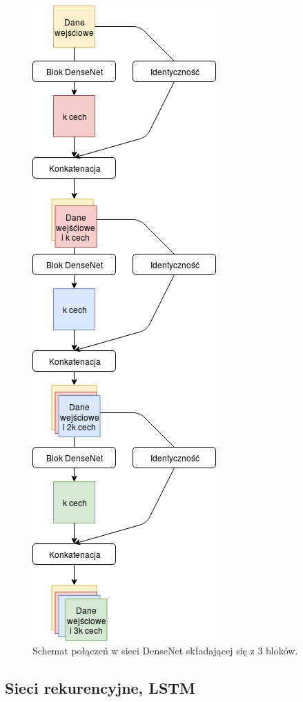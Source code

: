 \documentclass[a4paper,11pt,twoside]{report}
\theoremstyle{definition}
\begin{document}
\begin{figure}[h!]
	\centering
	\includegraphics[scale=0.6]{densenet}
	\caption{Schemat połączeń w sieci DenseNet składającej się z 3 bloków.}
	\label{fig:denseNet}
\end{figure}

\subsection{Sieci rekurencyjne, LSTM}
\end{document}
